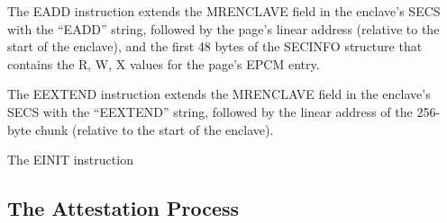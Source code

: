 
The EADD instruction extends the MRENCLAVE field in the enclave's SECS with the
``EADD'' string, followed by the page's linear address (relative to the start
of the enclave), and the first 48 bytes of the SECINFO structure that contains
the R, W, X values for the page's EPCM entry.

\begin{table}[hbt]
  \caption{
    Data extended into MRENCLAVE by the EADD instruction.
  }
  \label{fig:eadd_mrenclave}
\end{table}


The EEXTEND instruction extends the MRENCLAVE field in the enclave's SECS with
the ``EEXTEND'' string, followed by the linear address of the 256-byte chunk
(relative to the start of the enclave).

\begin{table}[hbt]
  \caption{
    Data extended into MRENCLAVE by the EEXTEND instruction.
  }
  \label{fig:eextend_mrenclave}
\end{table}


The EINIT instruction

\subsection{The Attestation Process}








